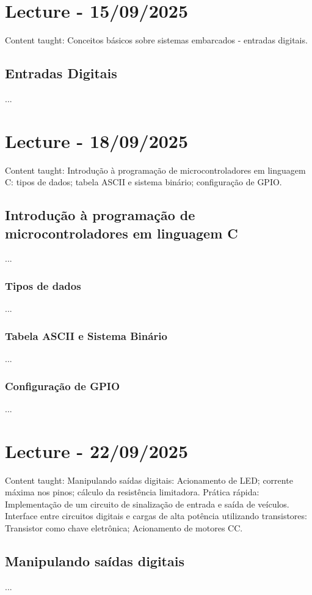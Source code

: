 \documentclass{article}
\begin{document}
\section{Lecture - 15/09/2025}
Content taught:  Conceitos básicos sobre sistemas embarcados - entradas digitais. 

\subsection{Entradas Digitais}
...

\section{Lecture - 18/09/2025}
Content taught:  Introdução à programação de microcontroladores em linguagem C: tipos de dados; tabela ASCII e sistema binário; configuração de GPIO.

\subsection{Introdução à programação de microcontroladores em linguagem C}
...

\subsubsection{Tipos de dados} 
...

\subsubsection{Tabela ASCII e Sistema Binário}
...

\subsubsection{Configuração de GPIO}
...

\section{Lecture - 22/09/2025}
Content taught:  Manipulando saídas digitais: Acionamento de LED; corrente máxima nos pinos; cálculo da resistência limitadora. Prática rápida: Implementação de um circuito de sinalização de entrada e saída de veículos. Interface entre circuitos digitais e cargas de alta potência utilizando transistores: Transistor como chave eletrônica; Acionamento de motores CC. 

\subsection{Manipulando saídas digitais}
...
\end{document}
